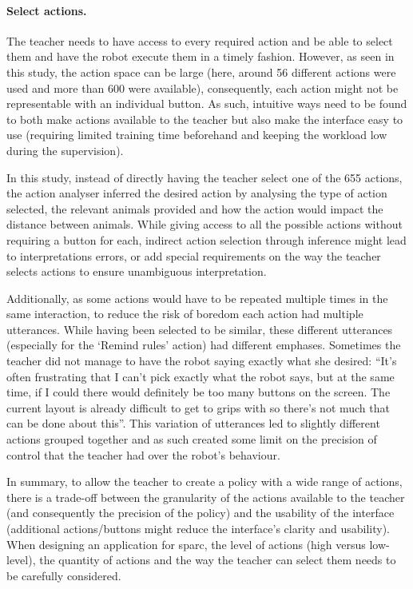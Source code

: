 \paragraph{Select actions.} %

The teacher needs to have access to every required action and be able to select them and have the robot execute them in a timely fashion. However, as seen in this study, the action space can be large (here, around 56 different actions were used and more than 600 were available), consequently, each action might not be representable with an individual button. As such, intuitive ways need to be found to both make actions available to the teacher but also make the interface easy to use (requiring limited training time beforehand and keeping the workload low during the supervision). 

In this study, instead of directly having the teacher select one of the 655 actions, the action analyser inferred the desired action by analysing the type of action selected, the relevant animals provided and how the action would impact the distance between animals. While giving access to all the possible actions without requiring a button for each, indirect action selection through inference might lead to interpretations errors, or add special requirements on the way the teacher selects actions to ensure unambiguous interpretation. 

Additionally, as some actions would have to be repeated multiple times in the same interaction, to reduce the risk of boredom each action had multiple utterances. While having been selected to be similar, these different utterances (especially for the `Remind rules' action) had different emphases. Sometimes the teacher did not manage to have the robot saying exactly what she desired: ``It’s often frustrating that I can’t pick exactly what the robot says, but at the same time, if I could there would definitely be too many buttons on the screen. The current layout is already difficult to get to grips with so there’s not much that can be done about this''. This variation of utterances led to slightly different actions grouped together and as such created some limit on the precision of control that the teacher had over the robot's behaviour.

In summary, to allow the teacher to create a policy with a wide range of actions, there is a trade-off between the granularity of the actions available to the teacher (and consequently the precision of the policy) and the usability of the interface (additional actions/buttons might reduce the interface's clarity and usability). When designing an application for \gls{sparc}, the level of actions (high versus low-level), the quantity of actions and the way the teacher can select them needs to be carefully considered.

